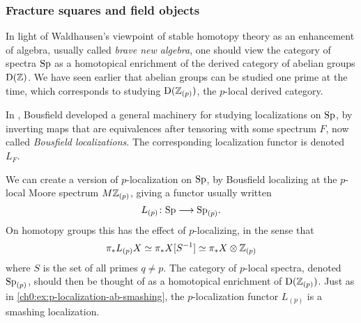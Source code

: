 \subsubsection{Fracture squares and field objects}
\label{ch0:sssec:fracture-squares}

In light of Waldhausen's viewpoint of stable homotopy theory as an enhancement of algebra, usually called \emph{brave new algebra}, one should view the category of spectra $\mathrm{Sp}$ as a homotopical enrichment of the derived category of abelian groups $\mathrm{D}(\mathbb{Z})$. We have seen earlier that abelian groups can be studied one prime at the time, which corresponds to studying $\mathrm{D}(\mathbb{Z}_{(p)})$, the $p$-local derived category. 

In \cite{bousfield_1979_localization}, Bousfield developed a general machinery for studying localizations on $\mathrm{Sp}$, by inverting maps that are equivalences after tensoring with some spectrum $F$, now called \emph{Bousfield localizations}. The corresponding localization functor is denoted $L_F$. 

\begin{example}
    We can create a version of $p$-localization on $\mathrm{Sp}$, by Bousfield localizing at the $p$-local Moore spectrum $M\mathbb{Z}_{(p)}$, giving a functor usually written 
    \[L_{(p)} \colon\mathrm{Sp} \longrightarrow \mathrm{Sp}_{(p)}.\] 
    On homotopy groups this has the effect of $p$-localizing, in the sense that 
    \[\pi_* L_{(p)}X \simeq \pi_* X [S^{-1}]\simeq \pi_* X \otimes \mathbb{Z}_{(p)}\]
    where $S$ is the set of all primes $q\neq p$. The category of $p$-local spectra, denoted $\mathrm{Sp}_{(p)}$, should then be thought of as a homotopical enrichment of $\mathrm{D}(\mathbb{Z}_{(p)})$. Just as in \cref{ch0:ex:p-localization-ab-smashing}, the $p$-localization functor $L_{(p)}$ is a smashing localization. 
\end{example}




